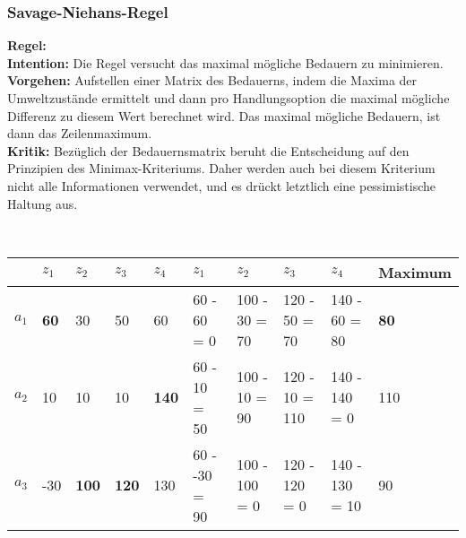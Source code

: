 \subsubsection{Savage-Niehans-Regel}
\textbf{Regel:}  \\
\textbf{Intention:} Die Regel versucht das maximal mögliche Bedauern zu minimieren.\\
\textbf{Vorgehen:} Aufstellen einer Matrix des Bedauerns, indem die Maxima der Umweltzustände ermittelt und dann pro Handlungsoption die maximal mögliche Differenz zu diesem Wert berechnet wird. Das maximal mögliche Bedauern, ist dann das Zeilenmaximum. \\
\textbf{Kritik:} Bezüglich der Bedauernsmatrix beruht die Entscheidung auf den Prinzipien des Minimax-Kriteriums. Daher werden auch bei diesem Kriterium nicht alle Informationen verwendet, und es drückt letztlich eine pessimistische Haltung aus. 
\begin{example} \\
	\begin{tabular}{|l|l|l|l|l||l|l|l|l|l|}
		\hline
		& $z_1$ & $z_2$ & $z_3$ & $z_4$ & $z_1$ & $z_2$ & $z_3$ & $z_4$ & Maximum\\ \hline
		$a_1$ & \textbf{60} & 30 & 50 & 60 & 60 - 60 = 0 & 100 - 30 = 70 & 120 - 50 = 70 & 140 - 60 = 80 & \textbf{80} \\ \hline
		$a_2$ & 10 & 10 & 10 & \textbf{140} & 60 - 10 = 50 & 100 - 10 = 90 & 120 - 10 = 110 & 140 - 140 = 0 & 110 \\ \hline
		$a_3$ & -30 & \textbf{100} & \textbf{120} & 130 & 60 - -30 = 90 & 100 - 100 = 0 & 120 - 120 = 0 & 140 - 130 = 10 & 90 \\ \hline		
	\end{tabular}
\end{example}

